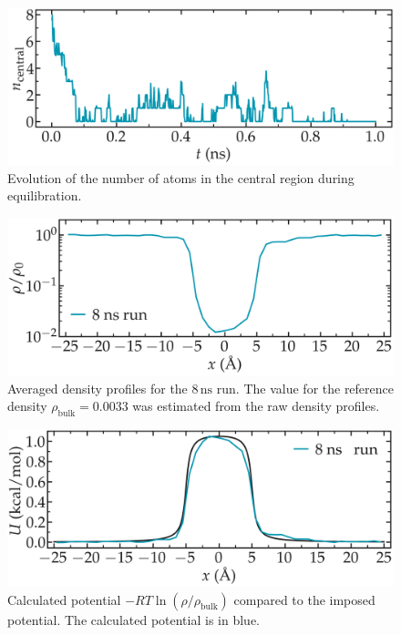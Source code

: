 \documentclass[9pt,tutorial]{livecoms}
\begin{document}
\begin{figure}
\centering
\includegraphics[width=\linewidth]{US-density-evolution}
\caption{Evolution of the number of atoms in the central region during equilibration.}
\label{fig:US-density-evolution}
\end{figure}

\begin{figure}
\centering
\includegraphics[width=\linewidth]{US-density}
\caption{Averaged density profiles for the $8\,\text{ns}$ run. The value for the reference density $\rho_\text{bulk} = 0.0033$ was estimated from the raw density profiles.}
\label{fig:US-density}
\end{figure}

\begin{figure}
\centering
\includegraphics[width=\linewidth]{US-FreeSampling}
\caption{Calculated potential $-R T \ln(\rho/\rho_\mathrm{bulk})$ compared to the imposed potential. The calculated potential is in blue.}
\label{fig:US-FreeSampling}
\end{figure}
\end{document}
